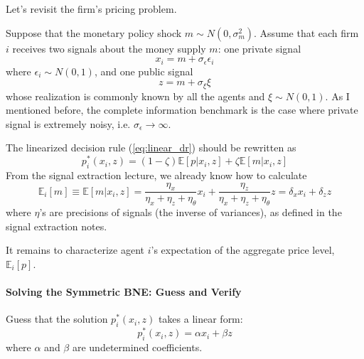 \documentclass[12pt]{article}
\begin{document}
Let's revisit the firm's pricing problem. 

Suppose that the monetary policy shock $m \sim N(0, \sigma^2_m)$. Assume that each firm $i$ receives two signals about the money supply $m$: one private signal
\[x_i = m + \sigma_\epsilon \epsilon_i\]
where $\epsilon_i \sim N(0,1)$, and one public signal
\[z = m + \sigma_{\xi} \xi\]
whose realization is commonly known by all the agents and $\xi \sim N(0,1)$. As I mentioned before, the complete information benchmark is the case where private signal is extremely noisy, i.e. $\sigma_\epsilon \to \infty$. 

The linearized decision rule (\ref{eq:linear_dr}) should be rewritten as
\begin{equation} \label{eq:bne}
	p_i^*(x_i, z) = (1-\zeta)\mathbb{E}[p|x_i, z] + \zeta \mathbb{E}[m|x_i, z]
\end{equation}
From the signal extraction lecture, we already know how to calculate
\[\mathbb{E}_i[m] \equiv \mathbb{E}[m|x_i, z] = \frac{\eta_x}{\eta_x + \eta_z + \eta_\theta} x_i + \frac{\eta_z}{\eta_x + \eta_z + \eta_\theta} z = \delta_x x_i + \delta_z z\]
where $\eta$'s are precisions of signals (the inverse of variances), as defined in the signal extraction notes.

It remains to characterize agent $i$'s expectation of the aggregate price level, $\mathbb{E}_i[p]$.

\paragraph{Solving the Symmetric BNE: Guess and Verify \\ [6pt]}
Guess that the solution $p_i^*(x_i, z)$ takes a linear form:
\begin{equation} \label{eq:guess}
	p^*_i(x_i, z) = \alpha x_i + \beta z 
\end{equation}
where $\alpha$ and $\beta$ are undetermined coefficients.
\end{document}
